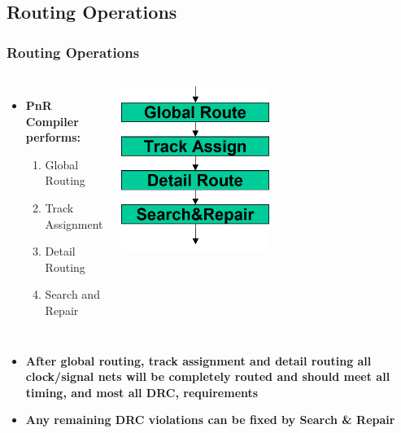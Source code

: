 \documentclass[compress]{beamer}
\begin{document}
\subsection[Operations]{Routing Operations}	
	\begin{frame}
		\frametitle{Routing Operations}
		\begin{columns}	
			\begin{itemize}
				\item \textbf{PnR Compiler performs:}
				\begin{enumerate}
					\item Global Routing
					\item Track Assignment
					\item Detail Routing
					\item Search and Repair
				\end{enumerate}
			\end{itemize}
			\begin{center}
				\includegraphics[width=0.5\textwidth]{operation}
			\end{center}
		\end{columns}
\begin{itemize}
	\item \textbf{After global routing, track assignment and detail routing all clock/signal nets will be completely routed and should meet all timing, and most all DRC, requirements}
	\item \textbf{Any remaining DRC violations can be fixed by Search \& Repair}
\end{itemize}
\end{frame}	
\end{document}
